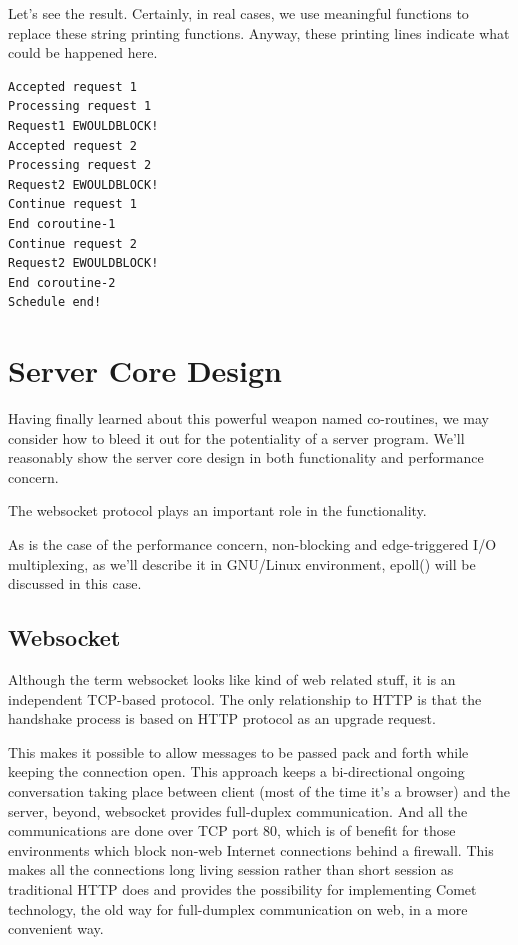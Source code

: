 \documentclass[numbers,numberedpars]{sigplanconf}
\begin{document}
Let's see the result. Certainly, in real cases, we use meaningful functions to replace these string printing functions. Anyway, these printing
lines indicate what could be happened here.

\begin{lstlisting}[caption=Coroutines running result]
Accepted request 1
Processing request 1
Request1 EWOULDBLOCK!
Accepted request 2
Processing request 2
Request2 EWOULDBLOCK!
Continue request 1
End coroutine-1
Continue request 2
Request2 EWOULDBLOCK!
End coroutine-2
Schedule end!
\end{lstlisting}

\section{Server Core Design}

Having finally learned about this powerful weapon named co-routines, we may consider how to bleed it out for the potentiality of a server program.
We'll reasonably show the server core design in both functionality and performance concern.

The websocket protocol plays an important role in the functionality.

As is the case of the performance concern, non-blocking and edge-triggered I/O multiplexing, as we'll describe it in GNU/Linux environment, epoll()
will be discussed in this case.

\subsection{Websocket} \label{Websocket}

Although the term websocket looks like kind of web related stuff, it is an independent TCP-based protocol.
The only relationship to HTTP is that the handshake process is based on HTTP protocol as an upgrade request.

This makes it possible to allow messages to be passed pack and forth while keeping the connection open.
This approach keeps a bi-directional ongoing conversation taking place between client (most of the time it's a browser) and the server,
beyond, websocket provides full-duplex communication.
And all the communications are done over TCP port 80, which is of benefit for those environments which block non-web Internet connections
behind a firewall. This makes all the connections long living session rather than short session as traditional HTTP does and provides the
possibility for implementing Comet technology, the old way for full-dumplex communication on web, in a more convenient way.
\end{document}
